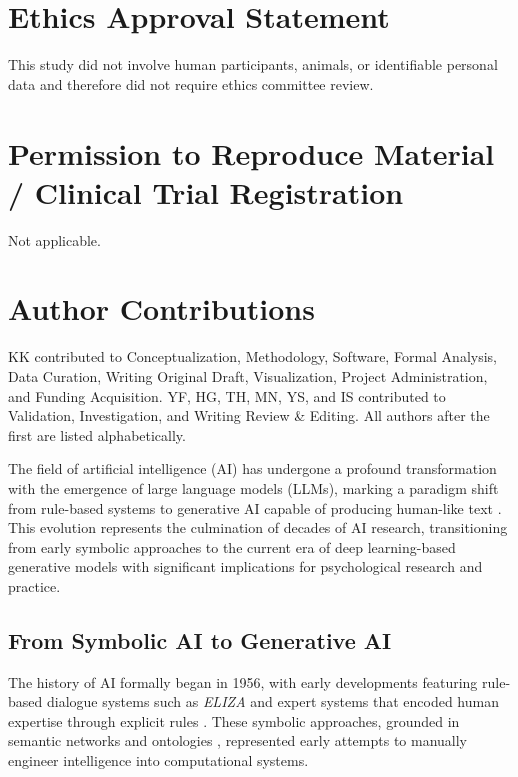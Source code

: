 \documentclass{wiley-article}
\begin{document}
\section*{Ethics Approval Statement}
This study did not involve human participants, animals, or identifiable personal data and therefore did not require ethics committee review.

\section*{Permission to Reproduce Material / Clinical Trial Registration}
Not applicable.

\section*{Author Contributions}
KK contributed to Conceptualization, Methodology, Software, Formal Analysis, Data Curation, Writing \textendash{} Original Draft, Visualization, Project Administration, and Funding Acquisition. YF, HG, TH, MN, YS, and IS contributed to Validation, Investigation, and Writing \textendash{} Review \& Editing. All authors after the first are listed alphabetically.

\bigskip 


The field of artificial intelligence (AI) has undergone a profound transformation with the emergence of large language models (LLMs), marking a paradigm shift from rule-based systems to generative AI capable of producing human-like text \citep{keExploringFrontiersLLMs2024}. This evolution represents the culmination of decades of AI research, transitioning from early symbolic approaches to the current era of deep learning-based generative models with significant implications for psychological research and practice.

\subsection*{From Symbolic AI to Generative AI}

The history of AI formally began in 1956, with early developments featuring rule-based dialogue systems such as \textit{ELIZA} \citep{rajaramanELIZAChatGPT2023} and expert systems that encoded human expertise through explicit rules \citep{tanApplicationExpertSystem2016}. These symbolic approaches, grounded in semantic networks and ontologies \citep{shu-hsienliaoExpertSystemMethodologies2005,sowa1992semantic}, represented early attempts to manually engineer intelligence into computational systems.
\end{document}

